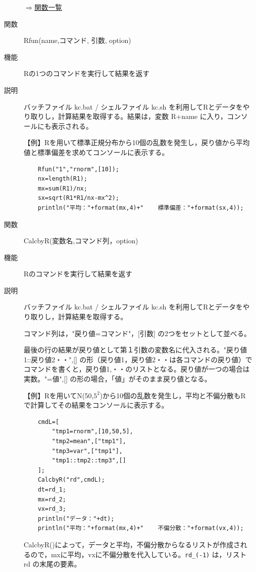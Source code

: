 \documentclass[papersize,a4paper,12pt,uplatex]{jsarticle}
\begin{document}
\begin{description}
\begin{flushright}  \hyperlink{functionlist}{$\Rightarrow$関数一覧}\end{flushright}

\hypertarget{rfun}{}
\item[関数]  Rfun(name,コマンド, 引数, option)
\item[機能]  Rの1つのコマンドを実行して結果を返す
\item[説明]  バッチファイル kc.bat / シェルファイル kc.sh を利用してRとデータをやり取りし，計算結果を取得する。結果は，変数 R+name に入り，コンソールにも表示される。

\vspace{\baselineskip}
【例】Rを用いて標準正規分布から10個の乱数を発生し，戻り値から平均値と標準偏差を求めてコンソールに表示する。
\begin{verbatim}
    Rfun("1","rnorm",[10]);
    nx=length(R1);
    mx=sum(R1)/nx;
    sx=sqrt(R1*R1/nx-mx^2);
    println("平均："+format(mx,4)+"    標準偏差："+format(sx,4));
\end{verbatim}

\hypertarget{calcbyr}{}
\item[関数]  CalcbyR(変数名,コマンド列，option)
\item[機能]  Rのコマンドを実行して結果を返す
\item[説明]  バッチファイル kc.bat / シェルファイル kc.sh を利用してRとデータをやり取りし，計算結果を取得する。

    コマンド列は，"戻り値=コマンド"，[引数] の2つをセットとして並べる。
    
    最後の行の結果が戻り値として第１引数の変数名に代入される。"戻り値1::戻り値2・・",[]  の形（戻り値1，戻り値2・・は各コマンドの戻り値）でコマンドを書くと，戻り値1,・・のリストとなる。戻り値が一つの場合は実数。"=値",[] の形の場合，「値」がそのまま戻り値となる。

\vspace{\baselineskip}
【例】Rを用いてN(50,$5^2$)から10個の乱数を発生し，平均と不偏分散もRで計算してその結果をコンソールに表示する。
\begin{verbatim}
    cmdL=[
        "tmp1=rnorm",[10,50,5],
        "tmp2=mean",["tmp1"],
        "tmp3=var",["tmp1"],
        "tmp1::tmp2::tmp3",[]
    ];
    CalcbyR("rd",cmdL);
    dt=rd_1;
    mx=rd_2;
    vx=rd_3;
    println("データ："+dt);
    println("平均："+format(mx,4)+"    不偏分散："+format(vx,4));
\end{verbatim}
  CalcbyR()によって，データと平均，不偏分散からなるリストが作成されるので，mxに平均，vxに不偏分散を代入している。\verb|rd_(-1)| は，リスト rd の末尾の要素。
  

\end{description}
\end{document}
